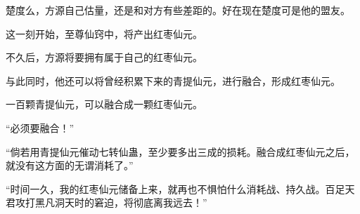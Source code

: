 \begin{this_body}
楚度么，方源自己估量，还是和对方有些差距的。好在现在楚度可是他的盟友。

这一刻开始，至尊仙窍中，将产出红枣仙元。

不久后，方源将要拥有属于自己的红枣仙元。

与此同时，他还可以将曾经积累下来的青提仙元，进行融合，形成红枣仙元。

一百颗青提仙元，可以融合成一颗红枣仙元。

“必须要融合！”

“倘若用青提仙元催动七转仙蛊，至少要多出三成的损耗。融合成红枣仙元之后，就没有这方面的无谓消耗了。”

“时间一久，我的红枣仙元储备上来，就再也不惧怕什么消耗战、持久战。百足天君攻打黑凡洞天时的窘迫，将彻底离我远去！”

\end{this_body}

